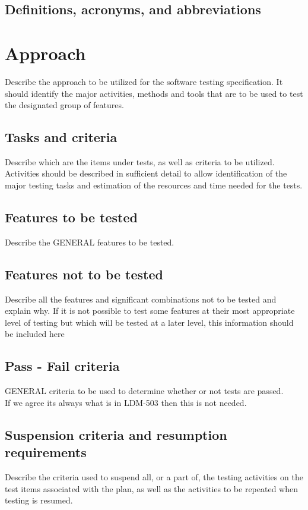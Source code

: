 \documentclass[DM,lsstdraft,STS,toc]{lsstdoc}
\begin{document}
\subsection{Definitions, acronyms, and abbreviations \label{sect:acronyms}} %
%


\section{Approach \label{sect:Approach}}
Describe the approach to be utilized for the software testing specification. It should identify the major activities, methods
and tools that are to be used to test the designated group of features.
\subsection{Tasks and criteria \label{sect:tasks}}
Describe which are the items under tests, as well as criteria to be utilized. Activities should be described in sufficient detail
to allow identification of the major testing tasks and estimation of the resources and time needed for the tests.
\subsection{Features to be tested \label{sect:feat2tested}}
Describe the GENERAL features to be tested.
\subsection{Features not to be tested \label{sect:featnot2tested}}
Describe all the features and significant combinations not to be tested and explain why. If it is not possible to test some
features at their most appropriate level of testing but which will be tested at a later level, this information should be
included here
\subsection{Pass - Fail criteria \label{sect:passfail}}
GENERAL criteria to be used to determine whether or not tests are passed.\\
If we agree its always what is in LDM-503 then this is not needed.

\subsection{Suspension criteria and resumption requirements \label{suspension}}
Describe the criteria used to suspend all, or a part of, the testing activities on the test items associated with
the plan, as well as the activities to be repeated when testing is resumed.
\end{document}
